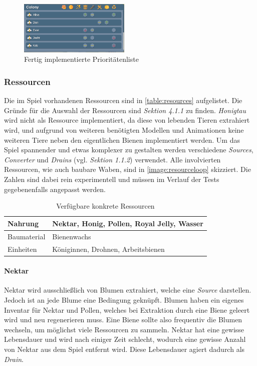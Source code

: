 \begin{figure}
    \begin{center}
        \includegraphics[width=200px]{0.bilder/prioritylist.png}
    \end{center}
    \caption{Fertig implementierte Prioritätenliste} \label{image:prioritylist}
\end{figure}



\subsubsection{Ressourcen}
Die im Spiel vorhandenen Ressourcen sind in \autoref{table:resources} aufgelistet. Die Gründe für die Auswahl der Ressourcen sind \textit{Sektion 4.1.1} zu finden. \textit{Honigtau} wird nicht als Ressource implementiert, da diese von lebenden Tieren extrahiert wird, und aufgrund von weiteren benötigten Modellen und Animationen keine weiteren Tiere neben den eigentlichen Bienen implementiert werden. Um das Spiel spannender und etwas komplexer zu gestalten werden verschiedene \textit{Sources}, \textit{Converter} und \textit{Drains} (vgl. \textit{Sektion 1.1.2}) verwendet. Alle involvierten Ressourcen, wie auch baubare Waben, sind in \autoref{image:resourceloop} skizziert. Die Zahlen sind dabei rein experimentell und müssen im Verlauf der Tests gegebenenfalls angepasst werden.

\begin{table}[]
    \centering
    \caption{Verfügbare konkrete Ressourcen}
    \label{table:resources}
    \begin{tabular}{|l|l|}
    \hline
    Nahrung     & Nektar, Honig, Pollen, Royal Jelly, Wasser \\ \hline
    Baumaterial & Bienenwachs                                \\ \hline
    Einheiten   & Königinnen, Drohnen, Arbeitsbienen         \\ \hline
    \end{tabular}
\end{table}



\paragraph{Nektar}
Nektar wird ausschließlich von Blumen extrahiert, welche eine \textit{Source} darstellen. Jedoch ist an jede Blume eine Bedingung geknüpft. Blumen haben ein eigenes Inventar für Nektar und Pollen, welches bei Extraktion durch eine Biene geleert wird und neu regenerieren muss. Eine Biene sollte also frequentiv die Blumen wechseln, um möglichst viele Ressourcen zu sammeln. Nektar hat eine gewisse Lebensdauer und wird nach einiger Zeit schlecht, wodurch eine gewisse Anzahl von Nektar aus dem Spiel entfernt wird. Diese Lebensdauer agiert dadurch als \textit{Drain}.

